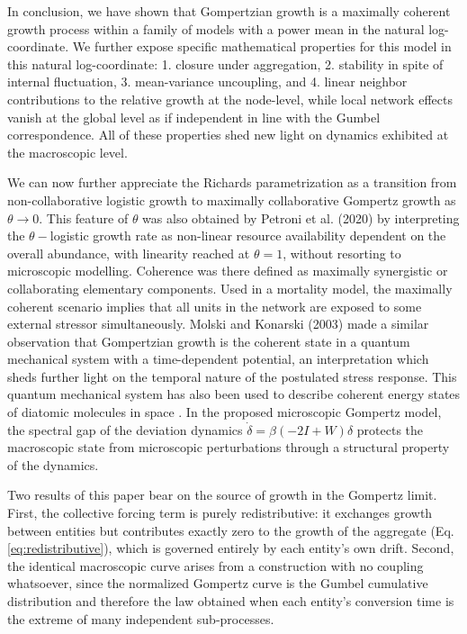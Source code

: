 \documentclass{article}
\begin{document}
In conclusion, we have shown that Gompertzian growth is a maximally coherent growth process within a family of models with a power mean in the natural log-coordinate. We further expose specific mathematical properties for this model in this natural log-coordinate: 1. closure under aggregation, 2. stability in spite of internal fluctuation, 3. mean-variance uncoupling, and 4. linear neighbor contributions to the relative growth at the node-level, while local network effects vanish at the global level as if independent in line with the Gumbel correspondence. All of these properties shed new light on dynamics exhibited at the macroscopic level.

We can now further appreciate the Richards parametrization as a transition from non-collaborative logistic growth to maximally collaborative Gompertz growth as $\theta \rightarrow 0$.
This feature of $\theta$ was also obtained by Petroni et al. (2020) \cite{petroni2020logistic} by interpreting the $\theta-$logistic growth rate as non-linear resource availability dependent on the overall abundance, with linearity reached at $\theta=1$, without resorting to microscopic modelling. Coherence was there defined as maximally synergistic or collaborating elementary components. Used in a mortality model, the maximally coherent scenario implies that all units in the network are exposed to some external stressor simultaneously.
Molski and Konarski (2003) \cite{molski2003coherent} made a similar observation that Gompertzian growth is the coherent state in a quantum mechanical system with a time-dependent potential, an interpretation which sheds further light on the temporal nature of the postulated stress response.
This quantum mechanical system has also been used to describe coherent energy states of diatomic molecules in space \cite{morse1929diatomic}. 
In the proposed microscopic Gompertz model, the spectral gap of the deviation dynamics $\dot{\delta}=\beta(-2I + W)\delta$ protects the macroscopic state from microscopic perturbations through a structural property of the dynamics.

Two results of this paper bear on the source of growth in the Gompertz limit. First, the collective forcing term is purely redistributive: it exchanges growth between entities but contributes exactly zero to the growth of the aggregate (Eq. \ref{eq:redistributive}), which is governed entirely by each entity's own drift. Second, the identical macroscopic curve arises from a construction with no coupling whatsoever, since the normalized Gompertz curve is the Gumbel cumulative distribution and therefore the law obtained when each entity's conversion time is the extreme of many independent sub-processes.
\end{document}
